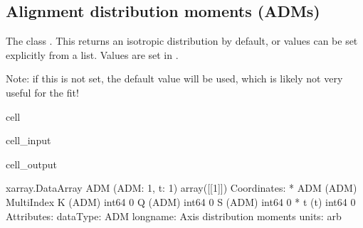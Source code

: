 \documentclass[letterpaper,table,10pt,english]{jupyterBook}
\begin{document}
\subsection{Alignment distribution moments (ADMs)}
\label{\detokenize{part2/basic_fitting_numerics_intro_260423:alignment-distribution-moments-adms}}
\sphinxAtStartPar
The class . This returns an isotropic distribution by default, or values can be set explicitly from a list. Values are set in .

\sphinxAtStartPar
Note: if this is not set, the default value will be used, which is likely not very useful for the fit!

\begin{sphinxuseclass}{cell}\begin{sphinxVerbatimInput}

\begin{sphinxuseclass}{cell_input}
\begin{sphinxVerbatim}[commandchars=\\\{\}]
\PYG{p}{[}\PYG{p}{]}\PYG{p}{[}\PYG{p}{]}
\end{sphinxVerbatim}

\end{sphinxuseclass}\end{sphinxVerbatimInput}
\begin{sphinxVerbatimOutput}

\begin{sphinxuseclass}{cell_output}
\begin{sphinxVerbatim}[commandchars=\\\{\}]
\PYGZlt{}xarray.DataArray \PYGZsq{}ADM\PYGZsq{} (ADM: 1, t: 1)\PYGZgt{}
array([[1]])
Coordinates:
  * ADM      (ADM) MultiIndex
  \PYGZhy{} K        (ADM) int64 0
  \PYGZhy{} Q        (ADM) int64 0
  \PYGZhy{} S        (ADM) int64 0
  * t        (t) int64 0
Attributes:
    dataType:   ADM
    long\PYGZus{}name:  Axis distribution moments
    units:      arb
\end{sphinxVerbatim}

\end{sphinxuseclass}\end{sphinxVerbatimOutput}

\end{sphinxuseclass}
\end{document}

